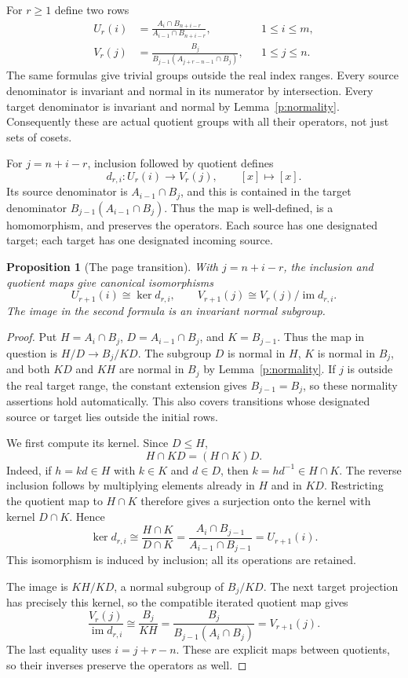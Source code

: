 \documentclass[11pt]{article}
\newtheorem{proposition}[theorem]{Proposition}
\theoremstyle{definition}
\theoremstyle{remark}\newtheorem{remark}[theorem]{Remark}
\DeclareMathOperator{\im}{im}
\begin{document}
For $r\geq1$ define two rows
\begin{align}
 U_r(i)&=
 \frac{A_i\cap B_{n+i-r}}{A_{i-1}\cap B_{n+i-r}},
       &&1\leq i\leq m,\label{p:source}\\
 V_r(j)&=
 \frac{B_j}{B_{j-1}(A_{j+r-n-1}\cap B_j)},
       &&1\leq j\leq n.\label{p:target}
\end{align}
The same formulas give trivial groups outside the real index ranges.
Every source denominator is invariant and normal in its numerator by
intersection. Every target denominator is invariant and normal by
Lemma~\ref{p:normality}. Consequently these are actual quotient groups
with all their operators, not just sets of cosets.

For $j=n+i-r$, inclusion followed by quotient defines
\begin{equation}\label{p:differential}
 d_{r,i}:U_r(i)\longrightarrow V_r(j),\qquad [x]\longmapsto[x].
\end{equation}
Its source denominator is $A_{i-1}\cap B_j$, and this is contained in
the target denominator $B_{j-1}(A_{i-1}\cap B_j)$. Thus the map is
well-defined, is a homomorphism, and preserves the operators. Each source
has one designated target; each target has one designated incoming source.

\begin{proposition}[The page transition]\label{p:transition}
With $j=n+i-r$, the inclusion and quotient maps give canonical
isomorphisms
\[
 U_{r+1}(i)\cong\ker d_{r,i},\qquad
 V_{r+1}(j)\cong V_r(j)/\im d_{r,i}.
\]
The image in the second formula is an invariant normal subgroup.
\end{proposition}
\begin{proof}
Put $H=A_i\cap B_j$, $D=A_{i-1}\cap B_j$, and $K=B_{j-1}$.
Thus the map in question is $H/D\to B_j/KD$. The subgroup $D$ is
normal in $H$, $K$ is normal in $B_j$, and both $KD$ and $KH$ are
normal in $B_j$ by Lemma~\ref{p:normality}. If $j$ is outside the real
target range, the constant extension gives $B_{j-1}=B_j$, so these
normality assertions hold automatically. This also covers transitions
whose designated source or target lies outside the initial rows.

We first compute its kernel. Since $D\leq H$,
\[
                     H\cap KD=(H\cap K)D.
\]
Indeed, if $h=kd\in H$ with $k\in K$ and $d\in D$, then
$k=hd^{-1}\in H\cap K$. The reverse inclusion follows by multiplying
elements already in $H$ and in $KD$. Restricting the quotient map to
$H\cap K$ therefore gives a surjection onto the kernel with kernel
$D\cap K$. Hence
\[
 \ker d_{r,i}\cong\frac{H\cap K}{D\cap K}
 =\frac{A_i\cap B_{j-1}}{A_{i-1}\cap B_{j-1}}
 =U_{r+1}(i).
\]
This isomorphism is induced by inclusion; all its operations are retained.

The image is $KH/KD$, a normal subgroup of $B_j/KD$. The next target
projection has precisely this kernel, so the compatible iterated quotient
map gives
\[
 \frac{V_r(j)}{\im d_{r,i}}
 \cong \frac{B_j}{KH}
 =\frac{B_j}{B_{j-1}(A_i\cap B_j)}
 =V_{r+1}(j).
\]
The last equality uses $i=j+r-n$. These are explicit maps between
quotients, so their inverses preserve the operators as well.
\end{proof}
\end{document}
